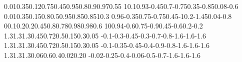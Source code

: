 \def\flo@odWd#1#2#3#4{\expandafter\def\csname flo@odW#1x#2\endcsname{#3}\expandafter\def\csname flo@odW#1y#2\endcsname{#4}}
\flo@odWd f1{0.01}{0.35}\flo@odWd f2{0.12}{0.75}\flo@odWd f3{0.45}{0.95}\flo@odWd f4{0.8}{0.9}\flo@odWd f5{0.97}{0.55}
\flo@odWd f6{1}{0.1}\flo@odWd f7{0.93}{-0.45}\flo@odWd f8{0.7}{-0.75}\flo@odWd f9{0.35}{-0.85}\flo@odWd f{10}{0.08}{-0.6}
\flo@odWd h1{0.01}{0.35}\flo@odWd h2{0.15}{0.8}\flo@odWd h3{0.5}{0.95}\flo@odWd h4{0.85}{0.85}\flo@odWd h5{1}{0.3}
\flo@odWd h6{0.96}{-0.35}\flo@odWd h7{0.75}{-0.75}\flo@odWd h8{0.45}{-1}\flo@odWd h9{0.2}{-1.45}\flo@odWd h{10}{0.04}{-0.8}
\flo@odWd d1{0}{0.1}\flo@odWd d2{0.2}{0.2}\flo@odWd d3{0.45}{0.8}\flo@odWd d4{0.78}{0.98}\flo@odWd d5{0.98}{0.6}
\flo@odWd d6{1}{0}\flo@odWd d7{0.94}{-0.6}\flo@odWd d8{0.75}{-0.9}\flo@odWd d9{0.45}{-0.6}\flo@odWd d{10}{0.2}{-0.2}
\def\flo@odVd#1#2#3#4#5{\expandafter\def\csname flo@odV#1#2\endcsname{{#3}{#4}{#5}}}
\flo@odVd f0{1.3}{1.3}{1.3}\flo@odVd f1{0.45}{0.72}{0.5}\flo@odVd f2{0.15}{0.3}{0.05}
\flo@odVd f3{-0.1}{-0.3}{-0.45}\flo@odVd f4{-0.3}{-0.7}{-0.8}\flo@odVd f5{-1.6}{-1.6}{-1.6}
\flo@odVd h0{1.3}{1.3}{1.3}\flo@odVd h1{0.45}{0.72}{0.5}\flo@odVd h2{0.15}{0.3}{0.05}
\flo@odVd h3{-0.1}{-0.35}{-0.45}\flo@odVd h4{-0.4}{-0.9}{-0.8}\flo@odVd h5{-1.6}{-1.6}{-1.6}
\flo@odVd d0{1.3}{1.3}{1.3}\flo@odVd d1{0.06}{0.6}{0.4}\flo@odVd d2{0.02}{0.2}{0}
\flo@odVd d3{-0.02}{-0.25}{-0.4}\flo@odVd d4{-0.06}{-0.5}{-0.7}\flo@odVd d5{-1.6}{-1.6}{-1.6}
\def\flo@odvat#1#2{\expandafter\expandafter\expandafter\flo@odvat@\csname flo@odV\flo@odwk#1\endcsname{#2}}
